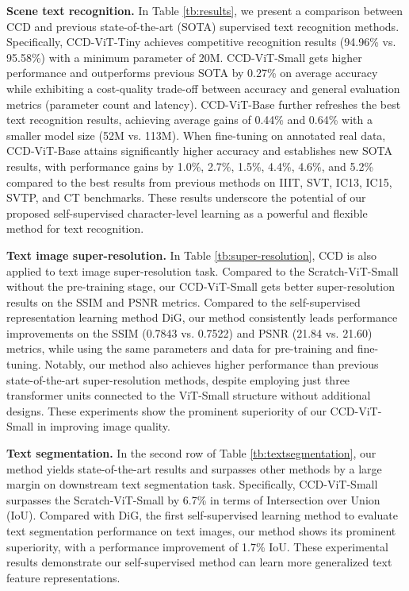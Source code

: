 \documentclass[10pt,twocolumn,letterpaper]{article}
\begin{document}
\noindent \textbf{Scene text recognition.} 
In Table \ref{tb:results}, we present a comparison between CCD and previous state-of-the-art (SOTA) supervised text recognition methods. Specifically, CCD-ViT-Tiny achieves competitive recognition results (94.96\% vs. 95.58\%) with a minimum parameter of 20M. CCD-ViT-Small gets higher performance and outperforms previous SOTA by 0.27\% on average accuracy while exhibiting a cost-quality trade-off between accuracy and general evaluation metrics (parameter count and latency). CCD-ViT-Base further refreshes the best text recognition results, achieving average gains of 0.44\% and 0.64\% with a smaller model size (52M vs. 113M). When fine-tuning on annotated real data, CCD-ViT-Base attains significantly higher accuracy and establishes new SOTA results, with performance gains by 1.0\%, 2.7\%, 1.5\%, 4.4\%,  4.6\%, and 5.2\% compared to the best results from previous methods on IIIT, SVT, IC13, IC15, SVTP, and CT benchmarks. 
These results underscore the potential of our proposed self-supervised character-level learning as a powerful and flexible method for text recognition.

\noindent \textbf{Text image super-resolution.}
In Table \ref{tb:super-resolution}, CCD is also applied to text image super-resolution task. 
Compared to the Scratch-ViT-Small without the pre-training stage, our CCD-ViT-Small gets better super-resolution results on the SSIM and PSNR metrics. Compared to the self-supervised representation learning method DiG, our method consistently leads performance improvements on the SSIM (0.7843 vs. 0.7522) and PSNR (21.84 vs. 21.60) metrics, while using the same parameters and data for pre-training and fine-tuning.
Notably, our method also achieves higher performance than previous state-of-the-art super-resolution methods, despite employing just three transformer units connected to the ViT-Small structure without additional designs. These experiments show the prominent superiority of our CCD-ViT-Small in improving image quality. 

\noindent \textbf{Text segmentation.}
In the second row of Table \ref{tb:textsegmentation}, our method yields state-of-the-art results and surpasses other methods by a large margin on downstream text segmentation task. Specifically, CCD-ViT-Small surpasses the Scratch-ViT-Small by 6.7\% in terms of Intersection over Union (IoU). Compared with DiG, the first self-supervised learning method to evaluate text segmentation performance on text images, our method shows its prominent superiority, with a performance improvement of 1.7\% IoU. These experimental results demonstrate our self-supervised method can learn more generalized text feature representations.
\vspace{-0.5em}
\end{document}
